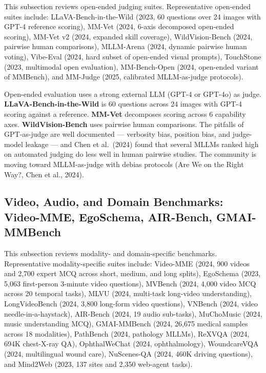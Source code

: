 \documentclass{article}
\begin{document}
This subsection reviews open-ended judging suites. Representative open-ended suites include: LLaVA-Bench-in-the-Wild (2023, 60 questions over 24 images with GPT-4 reference scoring), MM-Vet (2024, 6-axis decomposed open-ended scoring), MM-Vet v2 (2024, expanded skill coverage), WildVision-Bench (2024, pairwise human comparisons), MLLM-Arena (2024, dynamic pairwise human voting), Vibe-Eval (2024, hard subset of open-ended visual prompts), TouchStone (2023, multimodal open evaluation), MM-Bench-Open (2024, open-ended variant of MMBench), and MM-Judge (2025, calibrated MLLM-as-judge protocols).

Open-ended evaluation uses a strong external LLM (GPT-4 or GPT-4o) as judge. \textbf{LLaVA-Bench-in-the-Wild} is 60 questions across 24 images with GPT-4 scoring against a reference. \textbf{MM-Vet} decomposes scoring across 6 capability axes. \textbf{WildVision-Bench} uses pairwise human comparisons. The pitfalls of GPT-as-judge are well documented --- verbosity bias, position bias, and judge-model leakage --- and Chen et al.~(2024) found that several MLLMs ranked high on automated judging do less well in human pairwise studies. The community is moving toward MLLM-as-judge with debias protocols (Are We on the Right Way?, Chen et al., 2024).

\subsection{Video, Audio, and Domain Benchmarks: Video-MME, EgoSchema, AIR-Bench, GMAI-MMBench}\label{video-audio-and-domain-benchmarks-video-mme-egoschema-air-bench-gmai-mmbench}

This subsection reviews modality- and domain-specific benchmarks. Representative modality-specific suites include: Video-MME (2024, 900 videos and 2,700 expert MCQ across short, medium, and long splits), EgoSchema (2023, 5,063 first-person 3-minute video questions), MVBench (2024, 4,000 video MCQ across 20 temporal tasks), MLVU (2024, multi-task long-video understanding), LongVideoBench (2024, 3,800 long-form video questions), VNBench (2024, video needle-in-a-haystack), AIR-Bench (2024, 19 audio sub-tasks), MuChoMusic (2024, music understanding MCQ), GMAI-MMBench (2024, 26,675 medical samples across 18 modalities), PathBench (2024, pathology MLLMs), ReXVQA (2024, 694K chest-X-ray QA), OphthalWeChat (2024, ophthalmology), WoundcareVQA (2024, multilingual wound care), NuScenes-QA (2024, 460K driving questions), and Mind2Web (2023, 137 sites and 2,350 web-agent tasks).
\end{document}
